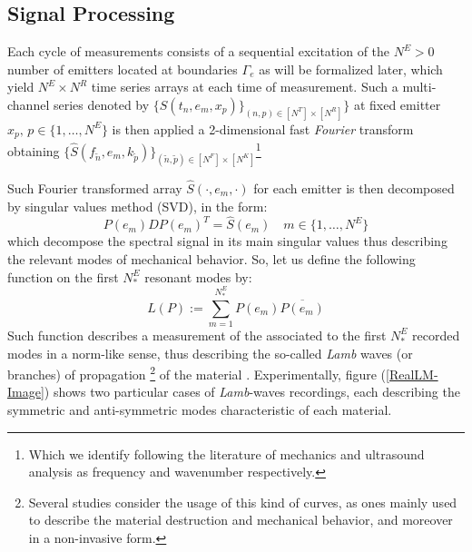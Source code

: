 \subsection{Signal Processing}
Each cycle of measurements consists of a sequential excitation of the $N^E > 0$ number of emitters located at boundaries $\Gamma_{e}$ as will be formalized later, which yield $N^E \times N^R$ time series arrays at each time of measurement.
Such a multi-channel series denoted by $\{ S(t_n, e_m,x_p) \}_{(n,p) \in [N^T]\times [N^R]}\}$ at fixed emitter $x_p, \, p \in \{1, \dots, N^E\}$ is then applied a 2-dimensional fast \textit{Fourier} transform obtaining $\{ \hat{S}(f_{\tilde{n}},e_m,k_{\tilde{p}}) \}_{(\tilde{n},\tilde{p}) \in [N^F]\times [N^K]}$\footnote{Which we identify following the literature of mechanics and ultrasound analysis as frequency and wavenumber respectively.}

Such Fourier transformed array $\hat{S}(\cdot, e_m, \cdot)$ for each emitter is then decomposed by singular values method (SVD), in the form:
\begin{equation*}
    P(e_m) \hat{D} P(e_m)^T = \hat{S}(e_m) \quad m \in \{1, \dots, N^E \}
\end{equation*}
which decompose the spectral signal in its main singular values thus describing the relevant modes of mechanical behavior.
So, let us define the following function on the first $N^E_*$ resonant modes by: 
\begin{equation*}
    L(P) := \sum \limits_{m = 1}^{N^E_*} P(e_m) \overline{P(e_m)}
\end{equation*}
Such function describes a measurement of the associated to the first $N^E_*$ recorded modes in a norm-like sense, thus describing the so-called \textit{Lamb} waves (or branches) of propagation \footnote{Several studies consider the usage of this kind of curves, as ones mainly used to describe the material destruction and mechanical behavior, and moreover in a non-invasive form.} of the material \cite{Rhee2007}. Experimentally, figure (\ref{RealLM-Image}) shows two particular cases of \textit{Lamb}-waves recordings, each describing the symmetric and anti-symmetric modes characteristic of each material.

